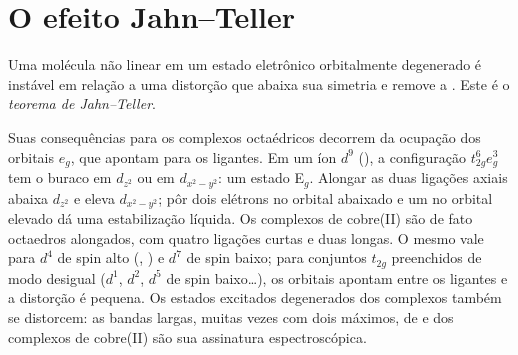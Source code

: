 \section{O efeito Jahn--Teller}

\begin{theorem}\label{thm:b3:complex-spectra-magnetism:jahn-teller}
Uma molécula não linear em um estado eletrônico orbitalmente degenerado é instável em
relação a uma distorção que abaixa sua simetria e remove a . Este é o
\emph{teorema de Jahn--Teller}.
\end{theorem}

\admitted

Suas consequências para os complexos octaédricos decorrem da ocupação dos orbitais
$e_g$, que apontam para os ligantes. Em um íon $d^9$ (), a configuração
$t_{2g}^6e_g^3$ tem o buraco em $d_{z^2}$ ou em $d_{x^2-y^2}$: um estado E$_g$. Alongar as duas
ligações axiais abaixa $d_{z^2}$ e eleva $d_{x^2-y^2}$; pôr dois elétrons no orbital abaixado
e um no orbital elevado dá uma estabilização líquida. Os complexos de cobre(II) são de
fato octaedros alongados, com quatro ligações curtas e duas longas. O mesmo vale para
$d^4$ de spin alto (, ) e $d^7$ de spin baixo; para conjuntos $t_{2g}$ preenchidos de
modo desigual ($d^1$, $d^2$, $d^5$ de spin baixo\dots), os orbitais apontam entre os
ligantes e a distorção é pequena. Os estados excitados degenerados dos complexos
também se distorcem: as bandas largas, muitas vezes com dois máximos, de
 e dos complexos de cobre(II) são sua assinatura espectroscópica.

